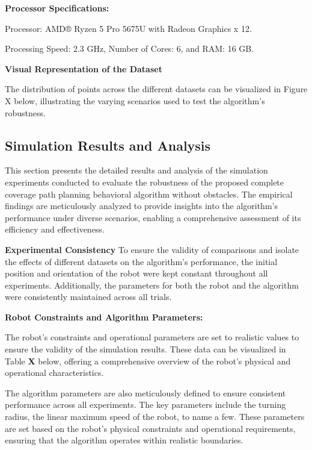 \vspace*{6mm}  

\textbf{Processor Specifications:}


Processor: AMD® Ryzen 5 Pro 5675U with Radeon Graphics x 12.


Processing Speed: 2.3 GHz, Number of Cores: 6, and RAM: 16 GB.


\vspace*{6mm}  

\textbf{Visual Representation of the Dataset}

The distribution of points across the different datasets can be visualized in Figure X below, illustrating the varying scenarios used to test the algorithm's robustness.

\subsection{Simulation Results and Analysis}

This section presents the detailed results and analysis of the simulation experiments conducted to evaluate the robustness of the proposed complete coverage path planning behavioral algorithm without obstacles. The empirical findings are meticulously analyzed to provide insights into the algorithm's performance under diverse scenarios, enabling a comprehensive assessment of its efficiency and effectiveness. 

\vspace*{6mm}  

\textbf{Experimental Consistency}
To ensure the validity of comparisons and isolate the effects of different datasets on the algorithm's performance, the initial position and orientation of the robot were kept constant throughout all experiments. Additionally, the parameters for both the robot and the algorithm were consistently maintained across all trials.


\vspace*{6mm}  

\textbf{Robot Constraints and Algorithm Parameters: } 


The robot's constraints and operational parameters are set to realistic values to ensure the validity of the simulation results. These data can be visualized in Table \textbf{X} below, offering a comprehensive overview of the robot's physical and operational characteristics.

\vspace*{6mm}  

The algorithm parameters are also meticulously defined to ensure consistent performance across all experiments. The key parameters include the turning radius, the linear maximum speed of the robot, to name a few. These parameters are set based on the robot's physical constraints and operational requirements, ensuring that the algorithm operates within realistic boundaries.

